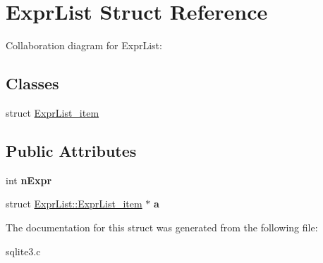 \hypertarget{structExprList}{}\section{Expr\+List Struct Reference}
\label{structExprList}


Collaboration diagram for Expr\+List\+:
\subsection*{Classes}
\begin{DoxyCompactItemize}
\item 
struct \hyperlink{structExprList_1_1ExprList__item}{Expr\+List\+\_\+item}
\end{DoxyCompactItemize}
\subsection*{Public Attributes}
\begin{DoxyCompactItemize}
\item 
int {\bfseries n\+Expr}\hypertarget{structExprList_a88bdbd62cce306124eea63ae9f80ec33}{}\label{structExprList_a88bdbd62cce306124eea63ae9f80ec33}

\item 
struct \hyperlink{structExprList_1_1ExprList__item}{Expr\+List\+::\+Expr\+List\+\_\+item} $\ast$ {\bfseries a}\hypertarget{structExprList_a02a4222d2dc4da64dcec416188abc16c}{}\label{structExprList_a02a4222d2dc4da64dcec416188abc16c}

\end{DoxyCompactItemize}


The documentation for this struct was generated from the following file\+:\begin{DoxyCompactItemize}
\item 
sqlite3.\+c\end{DoxyCompactItemize}

